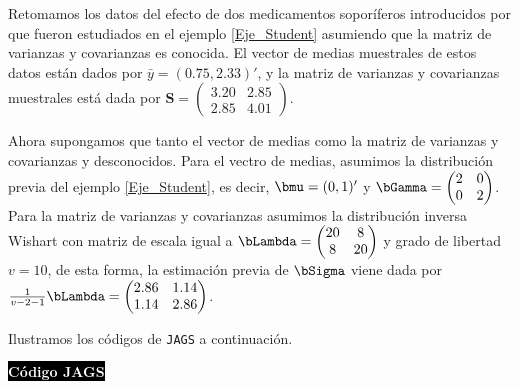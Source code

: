 \begin{Eje}\label{Eje_Student_2}
Retomamos los datos del efecto de dos medicamentos soporíferos introducidos por  que fueron estudiados en el ejemplo \ref{Eje_Student} asumiendo que la matriz de varianzas y covarianzas es conocida. El vector de medias muestrales de estos datos están dados por $\bar{y}=(0.75, 2.33)'$, y la matriz de varianzas y covarianzas muestrales está dada por $\mathbf{S}=\begin{pmatrix}3.20&2.85\\2.85&4.01\end{pmatrix}$. 

Ahora supongamos que tanto el vector de medias como la matriz de varianzas y covarianzas y desconocidos. Para el vectro de medias, asumimos la distribución previa del ejemplo \ref{Eje_Student}, es decir, $\bmu=(0,1)'$ y $\bGamma=\begin{pmatrix}2&0\\0&2\end{pmatrix}$. Para la matriz de varianzas y covarianzas asumimos la distribución inversa Wishart con matriz de escala igual a $\bLambda=\begin{pmatrix}20&8\\8&20\end{pmatrix}$ y grado de libertad $v=10$, de esta forma, la estimación previa de $\bSigma$ viene dada por $\frac{1}{v-2-1}\bLambda=\begin{pmatrix}2.86&1.14\\ 1.14&2.86\end{pmatrix}$. 

Ilustramos los códigos de \verb'JAGS' a continuación.

\colorbox{black}{\textcolor{white}{\textbf{C\'odigo JAGS}}}
\begin{knitrout}
\color{fgcolor}\begin{kframe}
\begin{alltt}
 \hlkwb{<-} 
\hlkwb{<-} \hlstd{(}\hlstd{(}\hlstd{,} \hlkwb{<-} \hlstd{(}\hlstd{(}\hlstd{,}\hlstd{,}\hlstd{,}\hlstd{),}\hlstd{,}\hlstd{)}
 \hlkwb{<-}  \hlkwb{<-} \hlstd{(}\hlstd{(}\hlstd{,}\hlstd{,}\hlstd{,}\hlstd{),}\hlstd{,}\hlstd{)}


\end{alltt}
\end{kframe}
\end{knitrout}
\end{Eje}
